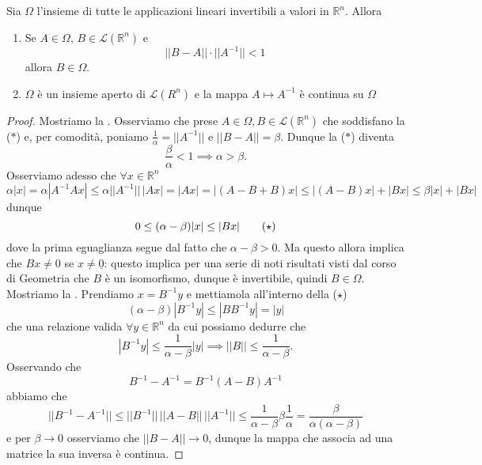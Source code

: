\begin{theorem}
    Sia $\mathit{\Omega}$ l'insieme di tutte le applicazioni lineari invertibili a valori in $\mathbb{R}^n$. Allora
    \begin{enumerate}[label=\protect\circled{\arabic*}]
        \item Se $A \in \mathit{\Omega}$, $B \in \mathcal{L}(\mathbb{R}^n)$ e
        \begin{equation*}
            || B - A || \cdot || A^{-1} || < 1 \tag{$\ast$}
        \end{equation*}
        allora $B \in \mathit{\Omega}$.
        \item $\mathit{\Omega}$ è un insieme aperto di $\mathcal{L}(R^n)$ e la mappa $A \mapsto A^{-1}$ è continua su $\mathit{\Omega}$ 
    \end{enumerate}
    \label{thm:continuity_of_the_inverse_matrix}
\end{theorem}
\begin{proof}
Mostriamo la . Osserviamo che prese $A \in \mathit{\Omega}, B \in \mathcal{L}(\mathbb{R}^n)$ che soddisfano la ($\ast$) e, per comodità, poniamo $\frac{1}{\alpha} = || A^{-1} ||$ e $|| B - A || = \beta$. Dunque la ($\ast$) diventa
$$
\frac{\beta}{\alpha} < 1 \implies \alpha > \beta.
$$
Osserviamo adesso che $\forall x \in \mathbb{R}^n$
$$
\alpha |x| = \alpha | A^{-1} A x | \leq \alpha || A^{-1} || \, |Ax| = |Ax| = |(A - B + B)x| \leq |(A-B)x| + |Bx| \leq \beta |x| + |Bx|
$$
dunque
\begin{equation*}
0 \leq (\alpha - \beta) |x| \leq |Bx| \tag{\text{$\star$}}
\end{equation*}
dove la prima eguaglianza segue dal fatto che $\alpha - \beta > 0$. Ma questo allora implica che $Bx \neq 0$ se $x \neq \underline{0}$: questo implica per una serie di noti risultati visti dal corso di Geometria che $B$ è un isomorfismo, dunque è invertibile, quindi $B \in \mathit{\Omega}$. \\
Mostriamo la . Prendiamo $x = B^{-1}y$ e mettiamola all'interno della ($\star$)
$$
(\alpha - \beta) |B^{-1}y| \leq |BB^{-1}y| = |y|
$$
che una relazione valida $\forall y \in \mathbb{R}^n$ da cui possiamo dedurre che
$$
    |B^{-1}y| \leq \frac{1}{\alpha - \beta} |y| \implies || B || \leq \frac{1}{\alpha - \beta}.
$$
Osservando che
$$
    B^{-1} - A^{-1} = B^{-1} (A-B) A^{-1}
$$
abbiamo che
$$
|| B^{-1} - A^{-1} || \leq || B^{-1} || \, || A - B || \, || A^{-1} || \leq \frac{1}{\alpha - \beta} \beta \frac{1}{\alpha} = \frac{\beta}{\alpha (\alpha - \beta)}
$$
e per $\beta \to 0$ osserviamo che $|| B - A || \to 0$, dunque la mappa che associa ad una matrice la sua inversa è continua.
\end{proof}
